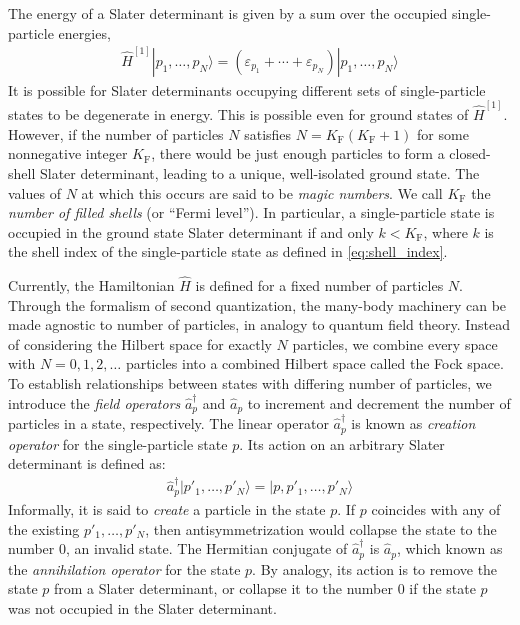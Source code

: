 The energy of a Slater determinant is given by a sum over the occupied single-particle energies,
\begin{align*}
  \hat{H}^{[1]} | p_1, \ldots, p_N \rangle = (\varepsilon_{p_1} + \cdots + \varepsilon_{p_N}) | p_1, \ldots, p_N \rangle
\end{align*}
It is possible for Slater determinants occupying different sets of single-particle states to be degenerate in energy.  This is possible even for ground states of $\hat{H}^{[1]}$.  However, if the number of particles $N$ satisfies $N = K_{\mathrm{F}} (K_{\mathrm{F}} + 1)$ for some nonnegative integer $K_{\mathrm{F}}$, there would be just enough particles to form a closed-shell Slater determinant, leading to a unique, well-isolated ground state.  The values of $N$ at which this occurs are said to be \textit{magic numbers}.  We call $K_{\mathrm{F}}$ the \textit{number of filled shells} (or ``Fermi level'').  In particular, a single-particle state is occupied in the ground state Slater determinant if and only $k < K_{\mathrm{F}}$, where $k$ is the shell index of the single-particle state as defined in \eqref{eq:shell_index}.

Currently, the Hamiltonian $\hat{H}$ is defined for a fixed number of particles $N$.  Through the formalism of second quantization, the many-body machinery can be made agnostic to number of particles, in analogy to quantum field theory.  Instead of considering the Hilbert space for exactly $N$ particles, we combine every space with $N = 0, 1, 2, \ldots$ particles into a combined Hilbert space called the Fock space.  To establish relationships between states with differing number of particles, we introduce the \textit{field operators} $\hat{a}_p^\dagger$ and $\hat{a}_p$ to increment and decrement the number of particles in a state, respectively.  The linear operator $\hat{a}_p^\dagger$ is known as \textit{creation operator} for the single-particle state $p$.  Its action on an arbitrary Slater determinant is defined as:
\begin{align*}
  \hat a_p^\dagger |p'_1, \ldots, p'_N\rangle =
  |p, p'_1, \ldots, p'_N\rangle
\end{align*}
Informally, it is said to \textit{create} a particle in the state $p$.  If $p$ coincides with any of the existing $p'_1, \ldots, p'_N$, then antisymmetrization would collapse the state to the number $0$, an invalid state.  The Hermitian conjugate of $\hat{a}_p^\dagger$ is $\hat{a}_p$, which known as the \textit{annihilation operator} for the state $p$.  By analogy, its action is to remove the state $p$ from a Slater determinant, or collapse it to the number $0$ if the state $p$ was not occupied in the Slater determinant.

